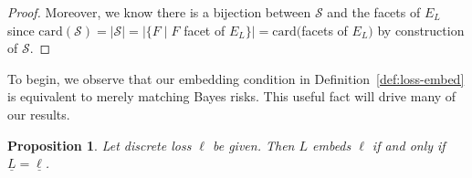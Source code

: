 \documentclass[11pt]{article}
\newcommand{\reals}{\mathbb{R}}
\newcommand{\card}{\mathrm{card}}
\newcommand{\R}{\mathcal{R}}
\newcommand{\Sc}{\mathcal{S}}
\newcommand{\Y}{\mathcal{Y}}
\newcommand{\risk}[1]{\underline{#1}}
\newcommand{\hinge}{L_{\mathrm{hinge}}}
\newcommand{\ellzo}{\ell_{\text{0-1}}}
\newtheorem{proposition}{Proposition}
\begin{document}
\begin{proof}
  Moreover, we know there is a bijection between $\Sc$ and the facets of $E_L$ since $\card(\Sc) = |\Sc| = |\{F \mid F$ facet of $E_L\}| = \card($facets of $E_L)$ by construction of $\Sc$.
\end{proof}




To begin, we observe that our embedding condition in Definition~\ref{def:loss-embed} is equivalent to merely matching Bayes risks.
This useful fact will drive many of our results.


\begin{proposition}\label{prop:embed-bayes-risks}
  Let discrete loss $\ell$ be given.
  Then $L$ embeds $\ell$ if and only if $\risk{L}=\risk{\ell}$.
\end{proposition}
\end{document}
